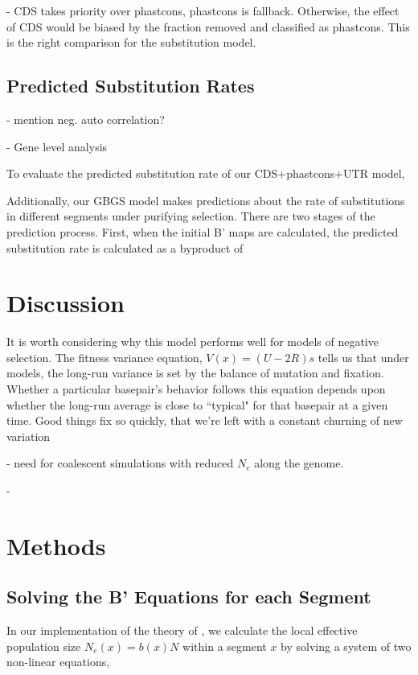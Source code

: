 \documentclass[11pt]{article}
\begin{document}
 - CDS takes priority over phastcons, phastcons is fallback. Otherwise, the
   effect of CDS would be biased by the fraction removed and classified as
   phastcons. This is the right comparison for the substitution model.

\subsection*{Predicted Substitution Rates}

- mention neg. auto correlation?

- Gene level analysis

To evaluate the predicted substitution rate of our CDS+phastcons+UTR model, 


Additionally, our GBGS model makes predictions about the rate of substitutions
in different segments under purifying selection. There are two stages of the
prediction process. First, when the initial B' maps are calculated, the
predicted substitution rate is calculated as a byproduct of 

\section*{Discussion}

It is worth considering why this model performs well for models of negative
selection. The fitness variance equation, $V(x) = (U-2R)s$ tells us that under
models, the long-run variance is set by the balance of mutation and fixation.
Whether a particular basepair's behavior follows this equation depends upon
whether the long-run average is close to ``typical" for that basepair at a
given time. Good things fix so quickly, that we're left with a constant
churning of new variation

- need for coalescent simulations with reduced $N_e$ along the genome.

-  


\section*{Methods}

\subsection*{Solving the B' Equations for each Segment}

In our implementation of the theory of \textcite{Santiago2016-mu}, we calculate
the local effective population size $N_e(x) = b(x) N$ within a segment $x$ by
solving a system of two non-linear equations, 
\end{document}
